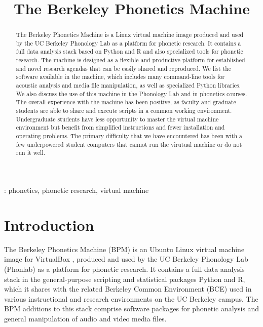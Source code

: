 \documentclass[a4paper]{article}
\title{The Berkeley Phonetics Machine}
\begin{document}
  \maketitle
  \begin{abstract}
  The Berkeley Phonetics Machine is a Linux virtual machine image produced and used by the UC Berkeley Phonology Lab as a platform for phonetic research. It contains a full data analysis stack based on Python and R and also specialized tools for phonetic research. The machine is designed as a flexible and productive platform for established and novel research agendas that can be easily shared and reproduced. We list the software available in the machine, which includes many command-line tools for acoustic analysis and media file manipulation, as well as specialized Python libraries. We also discuss the use of this machine in the Phonology Lab and in phonetics courses. The overall experience with the machine has been positive, as faculty and graduate students are able to share and execute scripts in a common working environment. Undergraduate students have less opportunity to master the virtual machine environment but benefit from simplified instructions and fewer installation and operating problems. The primary difficulty that we have encountered has been with a few underpowered student computers that cannot run the virutual machine or do not run it well.
  \end{abstract}
  : phonetics, phonetic research, virtual machine




  \section{Introduction}
    The Berkeley Phonetics Machine (BPM) is an Ubuntu Linux \cite{Ubuntu} virtual machine image for VirtualBox \cite{virtualbox}, produced and used by the UC Berkeley Phonology Lab (Phonlab) as a platform for phonetic research. It contains a full data analysis stack in the general-purpose scripting and statistical packages Python and R, which it shares with the related Berkeley Common Environment (BCE) used in various instructional and research environments on the UC Berkeley campus. The BPM additions to this stack comprise software packages for phonetic analysis and general manipulation of audio and video media files.
\end{document}
